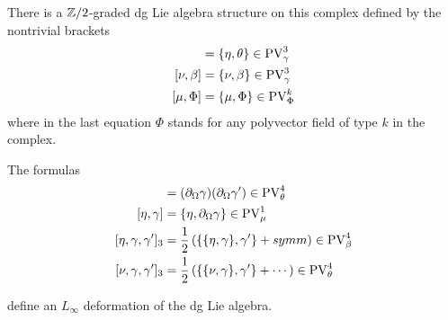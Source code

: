 \documentclass[11pt]{amsart}
\def\PV{{\rm PV}}
\def\div{\partial_\Omega}
\begin{document}
There is a $\mathbb Z/2$-graded dg Lie algebra structure on this complex defined by the nontrivial brackets
\begin{align*}
[\eta, \theta] & = \{\eta, \theta\} \in \PV^3_\gamma \\
[\nu, \beta] & = \{\nu, \beta\} \in \PV^3_\gamma \\ 
[\mu, \Phi] & = \{\mu, \Phi\} \in \PV^k_\Phi
\end{align*}
where in the last equation $\Phi$ stands for any polyvector field of type $k$ in the complex. 

\begin{prop}
The formulas 
\begin{align*}
[\gamma, \gamma'] & = (\partial_\Omega \gamma) (\partial_\Omega \gamma') \in \PV^4_\theta \\
[\eta, \gamma] & = \{\eta, \div \gamma\} \in \PV^1_\mu \\
[\eta, \gamma, \gamma']_3 & = \frac12 \left(\{\{\eta, \gamma\}, \gamma'\} + symm\right) \in \PV^4_\beta \\
[\nu, \gamma, \gamma']_3 & = \frac12 \left(\{\{\nu, \gamma\}, \gamma'\} + \cdots \right) \in \PV^4_\theta
\end{align*}
\end{prop}
define an $L_\infty$ deformation of the dg Lie algebra. 
\end{document}
